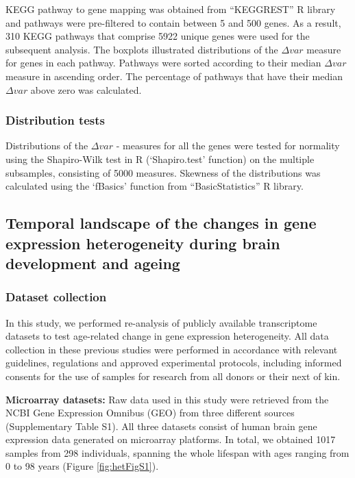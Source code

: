 \documentclass[12pt,twoside]{unicam}
\begin{document}
KEGG pathway to gene mapping was obtained from ``KEGGREST'' R library and pathways were pre-filtered to contain between 5 and 500 genes. As a result, 310 KEGG pathways that comprise 5922 unique genes were used for the subsequent analysis. The boxplots illustrated distributions of the \(\Delta var\) measure for genes in each pathway. Pathways were sorted according to their median \(\Delta var\) measure in ascending order. The percentage of pathways that have their median \(\Delta var\) above zero was calculated.

\hypertarget{distribution-tests}{%
\subsubsection{Distribution tests}\label{distribution-tests}}

Distributions of the \(\Delta var\) - measures for all the genes were tested for normality using the Shapiro-Wilk test in R (`Shapiro.test' function) on the multiple subsamples, consisting of 5000 measures. Skewness of the distributions was calculated using the `fBasics' function from ``BasicStatistics'' R library.

\hypertarget{hetMethods}{%
\subsection{Temporal landscape of the changes in gene expression heterogeneity during brain development and ageing}\label{hetMethods}}

\hypertarget{hetDatasets}{%
\subsubsection{Dataset collection}\label{hetDatasets}}

In this study, we performed re-analysis of publicly available transcriptome datasets to test age-related change in gene expression heterogeneity. All data collection in these previous studies were performed in accordance with relevant guidelines, regulations and approved experimental protocols, including informed consents for the use of samples for research from all donors or their next of kin.

\textbf{Microarray datasets:} Raw data used in this study were retrieved from the NCBI Gene Expression Omnibus (GEO) from three different sources (Supplementary Table S1). All three datasets consist of human brain gene expression data generated on microarray platforms. In total, we obtained 1017 samples from 298 individuals, spanning the whole lifespan with ages ranging from 0 to 98 years (Figure \ref{fig:hetFigS1}).
\end{document}
